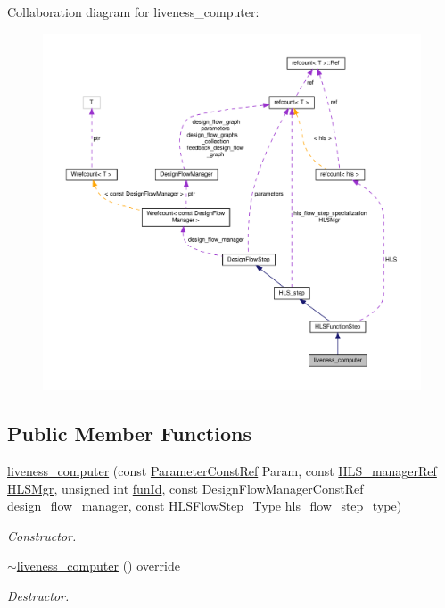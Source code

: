 Collaboration diagram for liveness\+\_\+computer\+:
\nopagebreak
\begin{figure}[H]
\begin{center}
\leavevmode
\includegraphics[width=350pt]{d9/da1/classliveness__computer__coll__graph}
\end{center}
\end{figure}
\subsection*{Public Member Functions}
\begin{DoxyCompactItemize}
\item 
\hyperlink{classliveness__computer_acfba7bac0a134cc6a1cc9c6d5e4974d5}{liveness\+\_\+computer} (const \hyperlink{Parameter_8hpp_a37841774a6fcb479b597fdf8955eb4ea}{Parameter\+Const\+Ref} Param, const \hyperlink{hls__manager_8hpp_acd3842b8589fe52c08fc0b2fcc813bfe}{H\+L\+S\+\_\+manager\+Ref} \hyperlink{classHLS__step_ade85003a99d34134418451ddc46a18e9}{H\+L\+S\+Mgr}, unsigned int \hyperlink{classHLSFunctionStep_a3e6434fd86c698b0c70520b859bff5b0}{fun\+Id}, const Design\+Flow\+Manager\+Const\+Ref \hyperlink{classDesignFlowStep_ab770677ddf087613add30024e16a5554}{design\+\_\+flow\+\_\+manager}, const \hyperlink{hls__step_8hpp_ada16bc22905016180e26fc7e39537f8d}{H\+L\+S\+Flow\+Step\+\_\+\+Type} \hyperlink{classHLS__step_aefd59af15346ec3f10bf12bd756e6777}{hls\+\_\+flow\+\_\+step\+\_\+type})
\begin{DoxyCompactList}\small\item\em Constructor. \end{DoxyCompactList}\item 
\hyperlink{classliveness__computer_a9773b9fa9cea6b46dc78a43fcffee8b3}{$\sim$liveness\+\_\+computer} () override
\begin{DoxyCompactList}\small\item\em Destructor. \end{DoxyCompactList}\end{DoxyCompactItemize}
